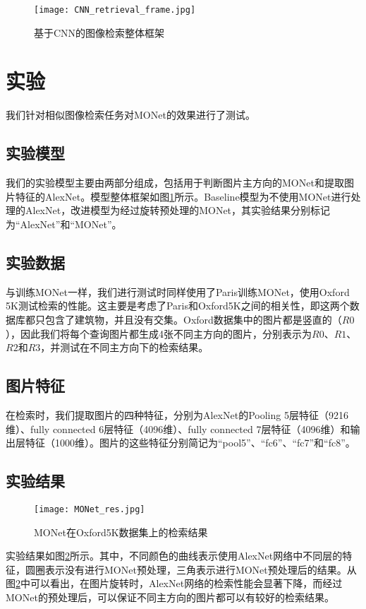 \begin{figure}
	\centering
	\texttt{[image: CNN\_retrieval\_frame.jpg]}
	\caption{基于CNN的图像检索整体框架}\label{fig:cnn_rf}
\end{figure}

\section{实验}
我们针对相似图像检索任务对MONet的效果进行了测试。

\subsection{实验模型}
我们的实验模型主要由两部分组成，包括用于判断图片主方向的MONet和提取图片特征的AlexNet。模型整体框架如图\ref{fig:cnn_rf}所示。Baseline模型为不使用MONet进行处理的AlexNet，改进模型为经过旋转预处理的MONet，其实验结果分别标记为“AlexNet”和“MONet”。

\subsection{实验数据}
与训练MONet一样，我们进行测试时同样使用了Paris\cite{philbin2008lost}训练MONet，使用Oxford 5K\cite{philbin2007object}测试检索的性能。这主要是考虑了Paris和Oxford5K之间的相关性，即这两个数据库都只包含了建筑物，并且没有交集。Oxford数据集中的图片都是竖直的（$R0$），因此我们将每个查询图片都生成4张不同主方向的图片，分别表示为$R0$、$R1$、$R2$和$R3$，并测试在不同主方向下的检索结果。

\subsection{图片特征}
在检索时，我们提取图片的四种特征，分别为AlexNet的Pooling 5层特征（9216维）、fully connected 6层特征（4096维）、fully connected 7层特征（4096维）和输出层特征（1000维）。图片的这些特征分别简记为“pool5”、“fc6”、“fc7”和“fc8”。

\subsection{实验结果}
\begin{figure}
	\centering
	\texttt{[image: MONet\_res.jpg]}
	\caption{MONet在Oxford5K数据集上的检索结果}\label{fig:monet_r}
\end{figure}
实验结果如图\ref{fig:monet_r}所示。其中，不同颜色的曲线表示使用AlexNet网络中不同层的特征，圆圈表示没有进行MONet预处理，三角表示进行MONet预处理后的结果。从图\ref{fig:monet_r}中可以看出，在图片旋转时，AlexNet网络的检索性能会显著下降，而经过MONet的预处理后，可以保证不同主方向的图片都可以有较好的检索结果。



